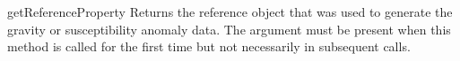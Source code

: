\begin{methoddesc}[SyntheticDataBase]{getReferenceProperty}{
}
Returns the reference \Data object that was used to generate the gravity or
susceptibility anomaly data. The  argument must be present
when this method is called for the first time but not necessarily in
subsequent calls.
\end{methoddesc}

